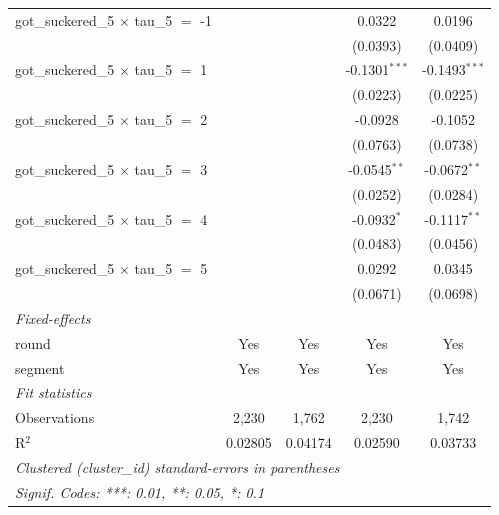 \begin{tabular}{lcccc}
   got\_suckered\_5 $\times$ tau\_5 $=$ -1       &                       &                 & 0.0322          & 0.0196\\   
                                                 &                       &                 & (0.0393)        & (0.0409)\\   
   got\_suckered\_5 $\times$ tau\_5 $=$ 1        &                       &                 & -0.1301$^{***}$ & -0.1493$^{***}$\\   
                                                 &                       &                 & (0.0223)        & (0.0225)\\   
   got\_suckered\_5 $\times$ tau\_5 $=$ 2        &                       &                 & -0.0928         & -0.1052\\   
                                                 &                       &                 & (0.0763)        & (0.0738)\\   
   got\_suckered\_5 $\times$ tau\_5 $=$ 3        &                       &                 & -0.0545$^{**}$  & -0.0672$^{**}$\\   
                                                 &                       &                 & (0.0252)        & (0.0284)\\   
   got\_suckered\_5 $\times$ tau\_5 $=$ 4        &                       &                 & -0.0932$^{*}$   & -0.1117$^{**}$\\   
                                                 &                       &                 & (0.0483)        & (0.0456)\\   
   got\_suckered\_5 $\times$ tau\_5 $=$ 5        &                       &                 & 0.0292          & 0.0345\\   
                                                 &                       &                 & (0.0671)        & (0.0698)\\   
   \midrule
   \emph{Fixed-effects}\\
   round                                         & Yes                   & Yes             & Yes             & Yes\\  
   segment                                       & Yes                   & Yes             & Yes             & Yes\\  
   \midrule
   \emph{Fit statistics}\\
   Observations                                  & 2,230                 & 1,762           & 2,230           & 1,742\\  
   R$^2$                                         & 0.02805               & 0.04174         & 0.02590         & 0.03733\\  
   \midrule \midrule
   \multicolumn{5}{l}{\emph{Clustered (cluster\_id) standard-errors in parentheses}}\\
   \multicolumn{5}{l}{\emph{Signif. Codes: ***: 0.01, **: 0.05, *: 0.1}}\\
\end{tabular}
\par\endgroup


